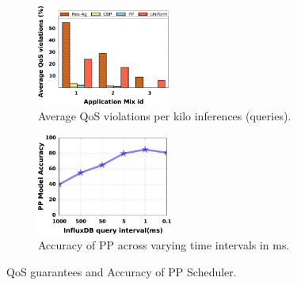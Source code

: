 \begin{figure}[tbp!]
\begin{subfigure}[b]{.23\textwidth}
  \centering
   \includegraphics[width=.99\linewidth,height=3.3cm]{figs/qos-1.pdf}
  \caption{Average QoS violations per kilo inferences (queries).}
  \label{fig:qos}
\end{subfigure}
\begin{subfigure}[b]{.23\textwidth}
  \centering
  \includegraphics[width=.99\linewidth, height=3.3cm]{figs/accuracy.pdf}
  \caption{Accuracy of PP across varying time intervals in ms.}
  \label{fig:accuracy}
\end{subfigure}
\vspace{-3mm}
\caption{QoS guarantees and Accuracy of PP Scheduler.}
\label{fig:tuning}
\end{figure}

